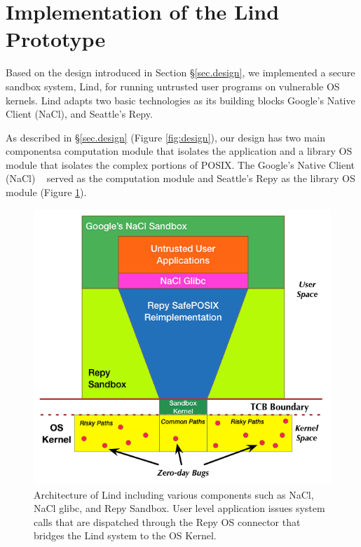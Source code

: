 \section{Implementation of the Lind Prototype}
\label{sec.implementation}

Based on the design introduced in Section \S{\ref{sec.design}},
we implemented a secure sandbox system, Lind,
for running untrusted user programs on vulnerable OS kernels.
Lind adapts two basic technologies as its building blocks\textendash
Google's Native Client (NaCl), and Seattle's Repy.

As described in \S{\ref{sec.design}} (Figure \ref{fig:design}), our design has
two main components\textendash a computation module that isolates the
application and a library OS module that isolates the complex
portions of POSIX.
The Google's Native Client (NaCl) ~\cite{NaCl-09} served as the computation
module and Seattle's Repy as the library OS module (Figure \ref{fig:architecture}).

\begin{figure}%
\centering
\includegraphics[width=1.0\columnwidth]{diagram/lind_architecture_new.png}
\caption{Architecture of Lind including various components such as NaCl, NaCl glibc, and Repy Sandbox.
User level application issues system calls that are dispatched through the Repy OS connector that bridges the Lind system to the OS Kernel.}

\label{fig:architecture}
\end{figure}

